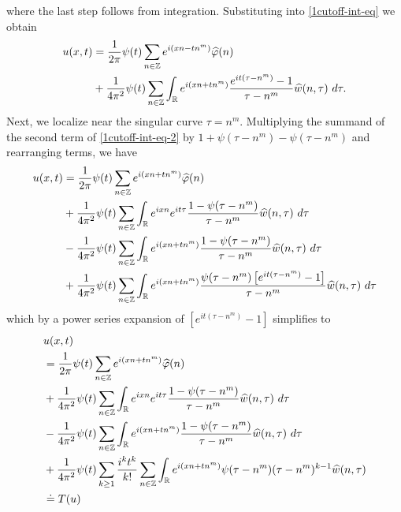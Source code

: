 %
%
where the last step follows from integration. Substituting
into \eqref{1cutoff-int-eq} we obtain
%
%
\begin{equation}
	\begin{split}
		\label{1cutoff-int-eq-2}
		u(x, t)
		& = \frac{1}{2 \pi} \psi(t) \sum_{n \in \mathbb{Z}} e^{i(xn - tn^m)} \widehat{\varphi}(n) 
		\\
		& + \frac{1}{4 \pi^2} \psi(t) \sum_{n \in \mathbb{Z}} \int_{\mathbb{R}}
		e^{i(xn + t n^m)} \frac{e^{it(\tau - n^m)}- 1}{\tau - n^m} 
		\widehat{w}(n, \tau) \ d \tau.
	\end{split}
\end{equation}
%
%
%
%
%
Next, we localize near the singular curve $\tau =  n^m$.  Multiplying the
summand of the second term of \eqref{1cutoff-int-eq-2} by $1 + \psi(\tau -
n^m) - \psi(\tau -
n^m) $ and
rearranging terms, we have
%
%
\begin{equation*}
	\begin{split}
		 u(x, t)
		& = \frac{1}{2 \pi} \psi(t) \sum_{n \in \mathbb{Z}} e^{i(xn + t n^{m 
		})} \widehat{\varphi}(n) 
		\\
		& + \frac{1}{4 \pi^2} \psi(t) \sum_{n \in \mathbb{Z}} \int_{\mathbb{R}} e^{ixn}  
		e^{it \tau} \frac{ 1 - \psi(\tau - n^m) 
		}{\tau - n^m} \widehat{w}(n, \tau) \ d \tau
		\\
		& - \frac{1}{4 \pi^2} \psi(t) \sum_{n \in \mathbb{Z}} \int _{\mathbb{R}} e^{i(xn + 
		t n^m)}
		 \frac{1- \psi(\tau - n^m)}{\tau - n^m} \widehat{w}(n, \tau) \ d \tau
		\\
		& + \frac{1}{4 \pi^2} \psi(t) \sum_{n \in \mathbb{Z}} \int_{\mathbb{R}}
		e^{i(xn + t n^m)}
		\frac{\psi(\tau - n^m)\left[ e^{it(\tau - n^m)}-1 
		\right]}{\tau - n^m} \widehat{w}(n, \tau) \ d \tau
	\end{split}
\end{equation*}
%
%
which by a power series expansion of $[e^{it(\tau - n^m)}-1]$ simplifies  
to
%
%
\begin{align}
	\label{1main-int-expression-0}
	& u(x, t) 
		\\
		\label{1main-int-expression-1}
		& = \frac{1}{2 \pi} \psi(t) \sum_{n \in \mathbb{Z}} e^{i(xn + tn^{m 
		})} \widehat{\varphi}(n) 
		\\
		\label{1main-int-expression-2}
		& + \frac{1}{4 \pi^2} \psi(t) \sum_{n\in \mathbb{Z}} \int_{\mathbb{R}} e^{ixn}  
		e^{it \tau} \frac{ 1 - \psi(\tau -  n^m) 
		}{\tau -  n^m} \widehat{w}(n, \tau) \ d \tau
		\\
		\label{1main-int-expression-3}
		& - \frac{1}{4 \pi^2} \psi(t) \sum_{n\in \mathbb{Z}} \int_{\mathbb{R}} e^{i(xn + 
		t n^m)}
		 \frac{1- \psi(\tau -  n^m)}{\tau -  n^m} \widehat{w}(n, \tau) \ d \tau
		\\
		\label{1main-int-expression-4}
		& + \frac{1}{4 \pi^2} \psi(t) \sum_{k \ge 1} \frac{i^k t^k}{k!}
		\sum_{n \in \mathbb{Z}} \int_{\mathbb{R}} e^{i(xn + t n^m )}
		\psi(\tau -  n^m) (\tau -  n^m)^{k-1} \widehat{w}(n, \tau)  
		\\
		& \doteq T(u) \notag
\end{align}

